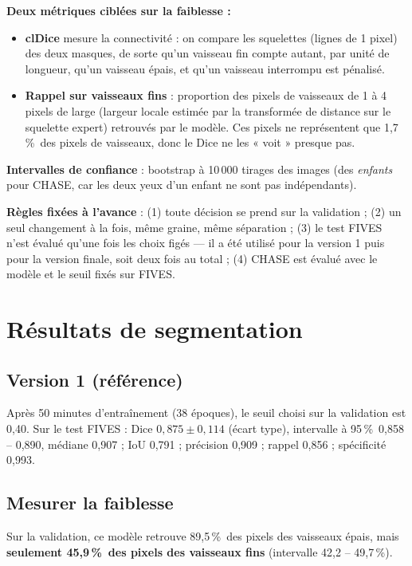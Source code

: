\documentclass[11pt,a4paper]{article}
\newcommand{\pct}{\,\%}
\begin{document}
\textbf{Deux métriques ciblées sur la faiblesse :}
\begin{itemize}
  \item \textbf{clDice} \cite{cldice} mesure la connectivité : on compare les squelettes (lignes de 1 pixel) des deux masques, de sorte qu'un vaisseau fin compte autant, par unité de longueur, qu'un vaisseau épais, et qu'un vaisseau interrompu est pénalisé.
  \item \textbf{Rappel sur vaisseaux fins} : proportion des pixels de vaisseaux de 1 à 4 pixels de large (largeur locale estimée par la transformée de distance sur le squelette expert) retrouvés par le modèle. Ces pixels ne représentent que 1,7\pct\ des pixels de vaisseaux, donc le Dice ne les « voit » presque pas.
\end{itemize}

\textbf{Intervalles de confiance} : bootstrap à 10\,000 tirages des images (des \emph{enfants} pour CHASE, car les deux yeux d'un enfant ne sont pas indépendants).

\textbf{Règles fixées à l'avance} : (1) toute décision se prend sur la validation ; (2) un seul changement à la fois, même graine, même séparation ; (3) le test FIVES n'est évalué qu'une fois les choix figés --- il a été utilisé pour la version 1 puis pour la version finale, soit deux fois au total ; (4) CHASE est évalué avec le modèle et le seuil fixés sur FIVES.

\section{Résultats de segmentation}

\subsection{Version 1 (référence)}
Après 50 minutes d'entraînement (38 époques), le seuil choisi sur la validation est 0,40. Sur le test FIVES : Dice $0{,}875\pm0{,}114$ (écart type), intervalle à 95\pct\ 0,858 -- 0,890, médiane 0,907 ; IoU 0,791 ; précision 0,909 ; rappel 0,856 ; spécificité 0,993.

\subsection{Mesurer la faiblesse}
Sur la validation, ce modèle retrouve 89,5\pct\ des pixels des vaisseaux épais, mais \textbf{seulement 45,9\pct\ des pixels des vaisseaux fins} (intervalle 42,2 -- 49,7\pct).
\end{document}
